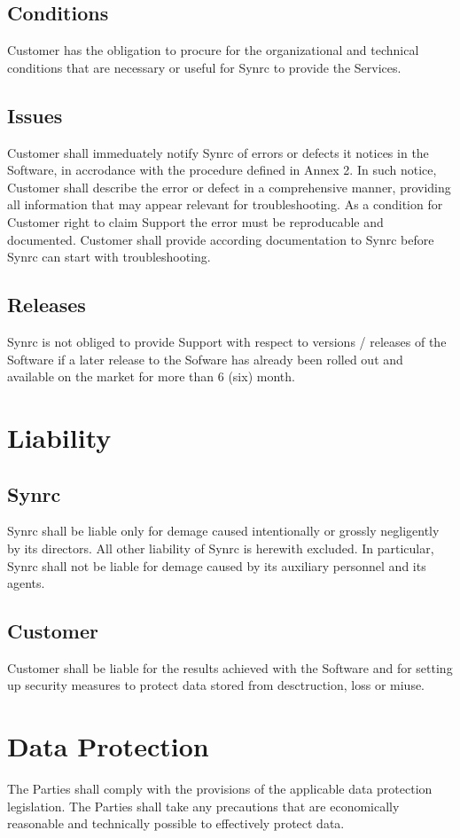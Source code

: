 \documentclass[11pt,oneside]{article}
\begin{document}
\subsection{Conditions}
Customer has the obligation to procure for the organizational and technical
conditions that are necessary or useful for Synrc to provide the Services.
\subsection{Issues}
Customer shall immeduately notify Synrc of errors or defects it notices in
the Software, in accrodance with the procedure defined in Annex 2. In such notice,
Customer shall describe the error or defect in a comprehensive manner,
providing all information that may appear relevant for troubleshooting. As a
condition for Customer right to claim Support the error must be
reproducable and documented. Customer shall provide according documentation
to Synrc before Synrc can start with troubleshooting.
\subsection{Releases}
Synrc is not obliged to provide Support with respect to versions / releases
of the Software if a later release to the Sofware has already been rolled out
and available on the market for more than 6 (six) month.

\newpage
\section{Liability}
\subsection{Synrc}
Synrc shall be liable only for demage caused intentionally or grossly
negligently by its directors. All other liability of Synrc is herewith excluded.
In particular, Synrc shall not be liable for demage caused by its auxiliary
personnel and its agents.
\subsection{Customer}
Customer shall be liable for the results achieved with the Software and for
setting up security measures to protect data stored from desctruction, loss or miuse.

\section{Data Protection}
The Parties shall comply with the provisions of the applicable data protection legislation.
The Parties shall take any precautions that are economically reasonable and technically
possible to effectively protect data.
\end{document}
